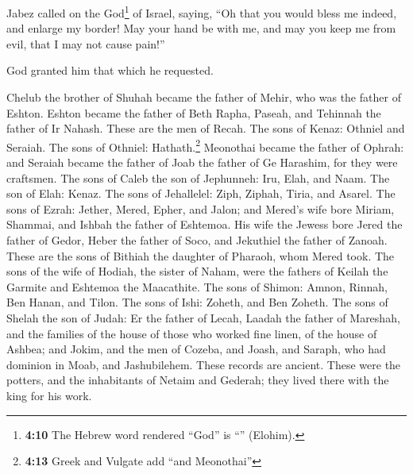  Jabez called on the God\footnote{\textbf{4:10} The
  Hebrew word rendered ``God'' is ``'' (Elohim).} of
Israel, saying, ``Oh that you would bless me indeed, and enlarge my
border! May your hand be with me, and may you keep me from evil, that I
may not cause pain!''

God granted him that which he requested.

 Chelub the brother of Shuhah became the father of Mehir,
who was the father of Eshton.  Eshton became the father
of Beth Rapha, Paseah, and Tehinnah the father of Ir Nahash. These are
the men of Recah.  The sons of Kenaz: Othniel and
Seraiah. The sons of Othniel: Hathath.\footnote{\textbf{4:13} Greek and
  Vulgate add ``and Meonothai''}  Meonothai became the
father of Ophrah: and Seraiah became the father of Joab the father of Ge
Harashim, for they were craftsmen.  The sons of Caleb the
son of Jephunneh: Iru, Elah, and Naam. The son of Elah: Kenaz.
 The sons of Jehallelel: Ziph, Ziphah, Tiria, and Asarel.
 The sons of Ezrah: Jether, Mered, Epher, and Jalon; and
Mered's wife bore Miriam, Shammai, and Ishbah the father of Eshtemoa.
 His wife the Jewess bore Jered the father of Gedor,
Heber the father of Soco, and Jekuthiel the father of Zanoah. These are
the sons of Bithiah the daughter of Pharaoh, whom Mered took.
 The sons of the wife of Hodiah, the sister of Naham,
were the fathers of Keilah the Garmite and Eshtemoa the Maacathite.
 The sons of Shimon: Amnon, Rinnah, Ben Hanan, and Tilon.
The sons of Ishi: Zoheth, and Ben Zoheth.  The sons of
Shelah the son of Judah: Er the father of Lecah, Laadah the father of
Mareshah, and the families of the house of those who worked fine linen,
of the house of Ashbea;  and Jokim, and the men of
Cozeba, and Joash, and Saraph, who had dominion in Moab, and
Jashubilehem. These records are ancient.  These were the
potters, and the inhabitants of Netaim and Gederah; they lived there
with the king for his work.

